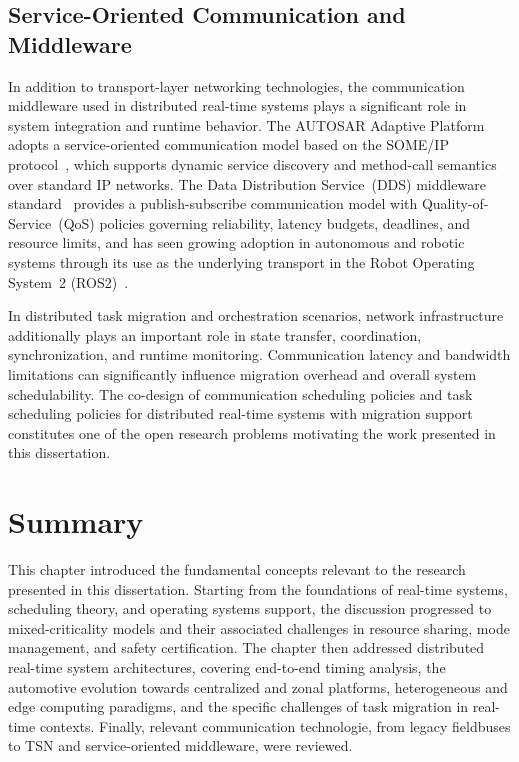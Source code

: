 \subsection{Service-Oriented Communication and Middleware}
\label{subsec:middleware}

In addition to transport-layer networking technologies, the
communication middleware used in distributed real-time
systems plays a significant role in system integration and
runtime behavior. The AUTOSAR Adaptive Platform adopts a
service-oriented communication model based on the SOME/IP
protocol~\cite{autosar2023}, which supports dynamic service
discovery and method-call semantics over standard IP
networks. The Data Distribution Service~(DDS) middleware
standard~\cite{omgdds2015} provides a publish-subscribe
communication model with Quality-of-Service~(QoS) policies
governing reliability, latency budgets, deadlines, and
resource limits, and has seen growing adoption in
autonomous and robotic systems through its use as the
underlying transport in the Robot Operating System~2
(ROS2)~\cite{maruyama2016}.

In distributed task migration and orchestration scenarios,
network infrastructure additionally plays an important role
in state transfer, coordination, synchronization, and runtime
monitoring. Communication latency and bandwidth limitations
can significantly influence migration overhead and overall
system schedulability. The co-design of communication
scheduling policies and task scheduling policies for
distributed real-time systems with migration support
constitutes one of the open research problems motivating
the work presented in this dissertation.

\section{Summary}
\label{sec:background_summary}

This chapter introduced the fundamental concepts relevant to
the research presented in this dissertation. Starting from
the foundations of real-time systems, scheduling theory,
and operating systems support, the discussion progressed to
mixed-criticality models and their associated challenges in
resource sharing, mode management, and safety certification.
The chapter then addressed distributed real-time system
architectures, covering end-to-end timing analysis, the
automotive evolution towards centralized and zonal platforms,
heterogeneous and edge computing paradigms, and the specific
challenges of task migration in real-time contexts. Finally,
relevant communication technologie, from legacy fieldbuses
to TSN and service-oriented middleware, were reviewed.

